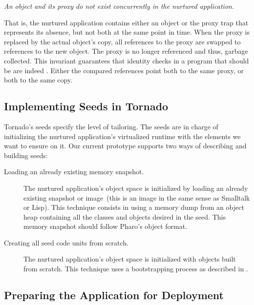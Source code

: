 \begin{center}\emph{An object and its proxy do not exist concurrently in the nurtured application.}\end{center}

That is, the nurtured application contains either an object or the proxy trap that represents its absence, but not both at the same point in time. When the proxy is replaced by the actual object's copy, all references to the proxy are swapped to references to the new object. The proxy is no longer referenced and thus, garbage collected. This invariant guarantees that identity checks in a program that should be  are indeed . Either the compared references point both to the same proxy, or both to the same copy.

\subsection{Implementing Seeds in Tornado}

Tornado's seeds specify the level of tailoring. The seeds are in charge of initializing the nurtured application's virtualized runtime with the elements we want to ensure on it. Our current prototype supports two ways of describing and building seeds: 

\begin{description}
\item[Loading an already existing memory snapshot.] The nurtured application's object space is initialized by loading an already existing snapshot or image~(\ie this is an image in the same sense as Smalltalk or Lisp). This technique consists in using a memory dump from an object heap containing all the classes and objects desired in the seed. This memory snapshot should follow Pharo's object format. 
\item[Creating all seed code units from scratch.] The nurtured application's object space is initialized with objects built from scratch. This technique uses a bootstrapping process as described in .
\end{description}


\subsection{Preparing the Application for Deployment}\label{sec:deploy}

